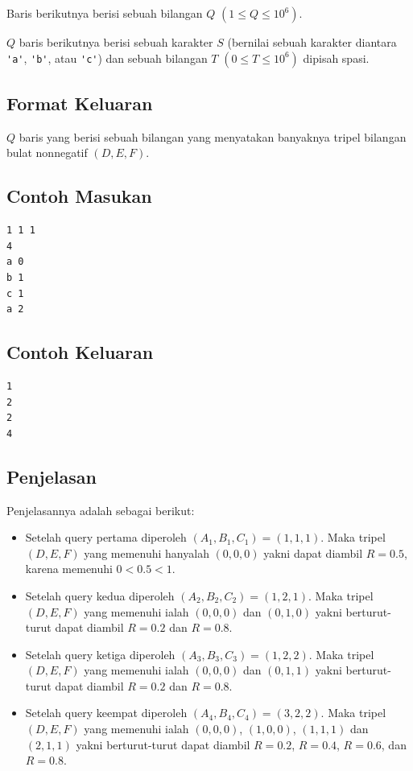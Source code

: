 \documentclass{article}
\begin{document}
Baris berikutnya berisi sebuah bilangan $Q$ $(1 \leq Q \leq 10^6)$.

$Q$ baris berikutnya berisi sebuah karakter $S$ (bernilai sebuah karakter diantara \lstinline|'a'|, \lstinline|'b'|, atau \lstinline|'c'|) dan sebuah bilangan $T$ $(0 \leq T \leq 10^6)$ dipisah spasi.

\subsection*{Format Keluaran}
$Q$ baris yang berisi sebuah bilangan yang menyatakan banyaknya tripel bilangan bulat nonnegatif $\left(D, E, F\right)$.

\begin{multicols}{2}
\subsection*{Contoh Masukan}
\begin{lstlisting}
1 1 1
4
a 0
b 1
c 1
a 2
\end{lstlisting}
\columnbreak
\subsection*{Contoh Keluaran}
\begin{lstlisting}
1
2
2
4
\end{lstlisting}
\vfill
\null
\end{multicols}

\subsection*{Penjelasan}
Penjelasannya adalah sebagai berikut:
\begin{itemize}

\item Setelah query pertama diperoleh $(A_1, B_1, C_1) = (1,1,1)$. Maka tripel $(D, E, F)$ yang memenuhi hanyalah $(0,0,0)$ yakni dapat diambil $R=0.5$, karena memenuhi $0<0.5<1$.

\item Setelah query kedua diperoleh $(A_2, B_2, C_2) = (1,2,1)$. Maka tripel $(D, E, F)$ yang memenuhi ialah $(0,0,0)$ dan $(0,1,0)$ yakni berturut-turut dapat diambil $R=0.2$ dan $R=0.8$.

\item Setelah query ketiga diperoleh $(A_3, B_3, C_3) = (1,2,2)$. Maka tripel $(D, E, F)$ yang memenuhi ialah $(0,0,0)$ dan $(0,1,1)$ yakni berturut-turut dapat diambil $R=0.2$ dan $R=0.8$.

\item Setelah query keempat diperoleh $(A_4, B_4, C_4) = (3,2,2)$. Maka tripel $(D, E, F)$ yang memenuhi ialah $(0,0,0)$, $(1,0,0)$, $(1,1,1)$ dan $(2,1,1)$ yakni berturut-turut dapat diambil $R=0.2$, $R=0.4$, $R=0.6$, dan $R=0.8$.

\end{itemize}
\end{document}
